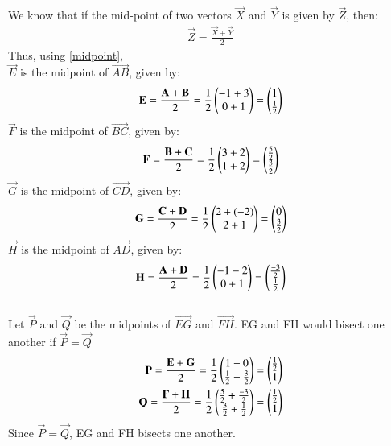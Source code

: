 \documentclass[journal,12pt,twocolumn]{IEEEtran}
\begin{document}
We know that if the mid-point of two vectors $\vec{X}$ and $\vec{Y}$ is given by $\vec{Z}$, then:
\begin{align}
    \vec{Z} = \frac{\vec{X} + \vec{Y}}{2}
    \label{midpoint}
\end{align}
Thus, using \eqref{midpoint},\\
$\vec{E}$ is the midpoint of $\vec{AB}$, given by:
\begin{align}
    \mathbf{E} = \frac{\mathbf{A} + \mathbf{B}}{2} =  \frac{1}{2}\begin{pmatrix}-1+3\\0+1\end{pmatrix} = \begin{pmatrix}1\\\frac{1}{2}\end{pmatrix}
\end{align}
$\vec{F}$ is the midpoint of $\vec{BC}$, given by:
\begin{align}
    \mathbf{F} = \frac{\mathbf{B} + \mathbf{C}}{2} =  \frac{1}{2}\begin{pmatrix}3+2\\1+2\end{pmatrix} = \begin{pmatrix}\frac{5}{2}\\\frac{3}{2}\end{pmatrix}
\end{align}
$\vec{G}$ is the midpoint of $\vec{CD}$, given by:
\begin{align}
    \mathbf{G} = \frac{\mathbf{C} + \mathbf{D}}{2} =  \frac{1}{2}\begin{pmatrix}2+(-2)\\2+1\end{pmatrix} = \begin{pmatrix}0\\\frac{3}{2}\end{pmatrix}
\end{align}
$\vec{H}$ is the midpoint of $\vec{AD}$, given by:
\begin{align}
    \mathbf{H} = \frac{\mathbf{A} + \mathbf{D}}{2} =  \frac{1}{2}\begin{pmatrix}-1-2\\0+1\end{pmatrix} = \begin{pmatrix}\frac{-3}{2}\\\frac{1}{2}\end{pmatrix}
\end{align}\\
Let $\vec{P}$ and $\vec{Q}$ be the midpoints of $\vec{EG}$ and $\vec{FH}$. EG and FH would bisect one another if $\vec{P} = \vec{Q}$
\begin{align}
    \mathbf{P} = \frac{\mathbf{E} + \mathbf{G}}{2} =  \frac{1}{2}\begin{pmatrix}1+0\\\frac{1}{2} + \frac{3}{2}\end{pmatrix} = \begin{pmatrix}\frac{1}{2}\\1\end{pmatrix}\\
    \mathbf{Q} = \frac{\mathbf{F} + \mathbf{H}}{2} =  \frac{1}{2}\begin{pmatrix}\frac{5}{2} + \frac{-3}{2}\\\frac{3}{2} + \frac{1}{2}\end{pmatrix} = \begin{pmatrix}\frac{1}{2}\\1\end{pmatrix}
\end{align}
Since $\vec{P} = \vec{Q}$, EG and FH bisects one another.
\end{document}
